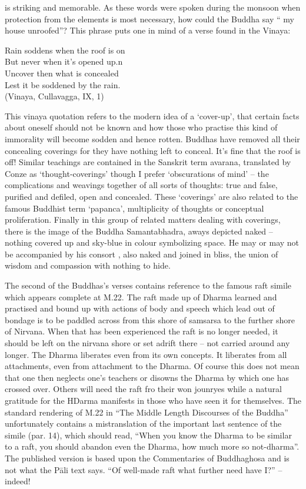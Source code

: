    is striking and memorable. As these words were spoken during the monsoon when protection from the elements is most necessary, how could the Buddha say “ my house unroofed”? This phrase puts one in mind of a verse found in the Vinaya:
\begin{MyDescription}[]{}   
   	Rain soddens when the roof is on\\
   	But never when it's opened up.n\\
   	Uncover then what is concealed\\
   	Lest it be soddened by the rain.\\
  	(Vinaya, Cullavagga, IX, 1)
\end{MyDescription}
   This vinaya quotation refers to the modern idea of a `cover-up', that certain facts about oneself should not be known and how those who practise this kind of immorality will become sodden and hence rotten. Buddhas have removed all their concealing coverings for they have nothing left to conceal. It's fine that the roof is off! Similar teachings are contained in the Sanskrit term avarana, translated by Conze as `thought-coverings' though I prefer `obscurations of mind' – the complications and weavings together of all sorts of thoughts: true and false, purified and defiled, open and concealed. These `coverings' are also related to the famous Buddhist term `papanca', multiplicity of thoughts or conceptual proliferation. Finally in this group of related matters dealing with coverings, there is the image of the Buddha Samantabhadra, aways depicted naked – nothing covered up and sky-blue in colour symbolizing space. He may or may not be accompanied by his consort , also naked and joined in bliss, the union of wisdom and compassion with nothing to hide.
   
   The second of the Buddhas's verses contains reference to the famous raft simile which appears complete at M.22. The raft made up of Dharma learned and practised and bound up with actions of body and speech which lead out of bondage is to be paddled across from this shore of samsarsa to the further shore of Nirvana. When that has been experienced the raft is no longer needed, it should be left on the nirvana shore or set adrift there – not carried around any longer. The Dharma liberates even from its own concepts. It liberates from all attachments, even from attachment to the Dharma. Of course this does not mean that one then neglects one's teachers or disowns the Dharma by which one has crossed over. Others will need the raft fro their won jounryes while a natural gratitude for the HDarma manifests in those who have seen it for themselves. The standard rendering of M.22 in “The Middle Length Discourses of the Buddha” unfortunately contains a mistranslation of the important last sentence of the simile (par. 14), which should read, “When you know the Dharma to be similar to a raft, you should abandon even the Dharma, how much more so not-dharma”. The published version is based upon the Commentaries of Buddhaghosa and is not what the P\=ali  text says. “Of well-made raft what further need have I?” – indeed!
   
